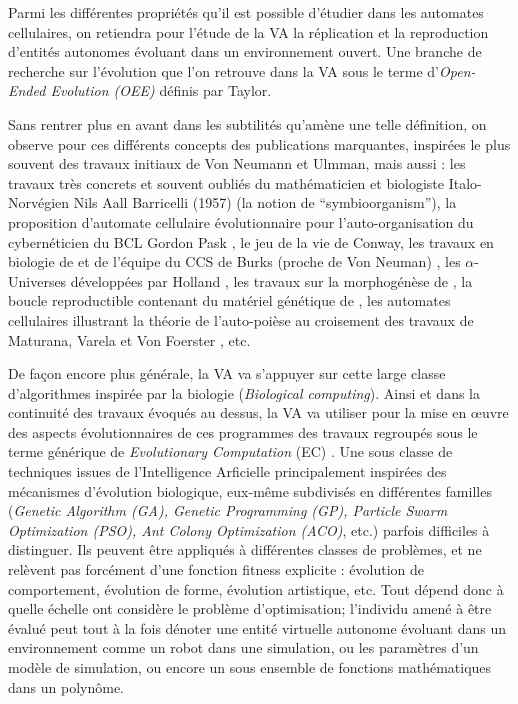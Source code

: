 Parmi les différentes propriétés qu'il est possible d'étudier dans les automates cellulaires, on retiendra pour l'étude de la VA la réplication et la reproduction d'entités autonomes évoluant dans un environnement ouvert. Une branche de recherche sur l'évolution que l'on retrouve dans la VA sous le terme d'\textit{Open-Ended Evolution (OEE)} définis par Taylor.

Sans rentrer plus en avant dans les subtilités qu'amène une telle définition, on observe pour ces différents concepts des publications marquantes, inspirées le plus souvent des travaux initiaux de Von Neumann et Ulmman, mais aussi : les travaux très concrets et souvent oubliés \autocites[111-130]{Dyson1997}{Fogel1998, Taylor1999, Hackett2014} du mathématicien et biologiste Italo-Norvégien Nils Aall Barricelli (1957) (la notion de \foreignquote{english}{symbioorganism}), la proposition d'automate cellulaire évolutionnaire pour l'auto-organisation du cybernéticien du BCL Gordon Pask \autocite{Pask1961}, le jeu de la vie de Conway, les travaux en biologie de \textcites{Pattee2001,Pattee2002, Conrad1970} et de l'équipe du CCS de Burks (proche de Von Neuman) \autocite{Weinberg1969}, les $\alpha$-Universes développées par Holland \autocites{Holland1976, Mcmullin1991}, les travaux sur la morphogénèse de \textcite{Hogeweg1978}, la boucle reproductible contenant du matériel génétique de \textcite{Langton1984}, les automates cellulaires illustrant la théorie de l'auto-poièse au croisement des travaux de Maturana, Varela et Von Foerster \autocites{Varela1974, McMullin1997b, McMullin1997, McMullin2004, CREA1985}, etc.

De façon encore plus générale, la VA va s'appuyer sur cette large classe d'algorithmes inspirée par la biologie (\textit{Biological computing}). Ainsi et dans la continuité des travaux évoqués au dessus, la VA va utiliser pour la mise en œuvre des aspects évolutionnaires de ces programmes des travaux regroupés sous le terme générique de \textit{Evolutionary Computation} (EC) \autocites{Back1997, Fogel1998, Fogel2006a}. Une sous classe de techniques issues de l'Intelligence Arficielle principalement inspirées des mécanismes d'évolution biologique, eux-même subdivisés en différentes familles (\textit{Genetic Algorithm (GA), Genetic Programming (GP), Particle Swarm Optimization (PSO), Ant Colony Optimization (ACO)}, etc.) parfois difficiles à distinguer. Ils peuvent être appliqués à différentes classes de problèmes, et ne relèvent pas forcément d'une fonction fitness explicite : évolution de comportement, évolution de forme, évolution artistique, etc. Tout dépend donc à quelle échelle ont considère le problème d'optimisation; l'individu amené à être évalué peut tout à la fois dénoter une entité virtuelle autonome évoluant dans un environnement comme un robot dans une simulation, ou les paramètres d'un modèle de simulation, ou encore un sous ensemble de fonctions mathématiques dans un polynôme.

